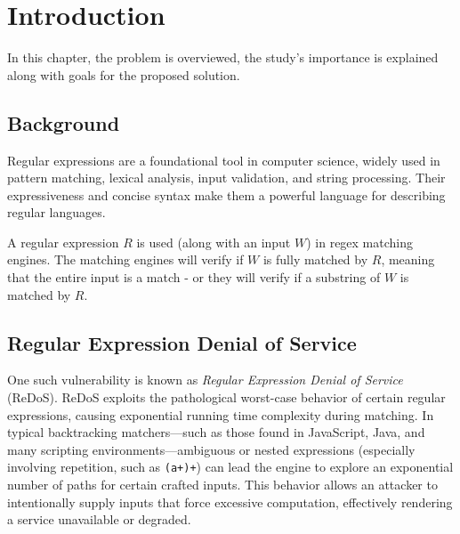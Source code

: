 \chapter{Introduction}\label{chap:intro}


In this chapter, the problem is overviewed, the study's importance is explained along with goals for the proposed solution. 

\section{Background}
Regular expressions are a foundational tool in computer science, widely used in pattern matching, lexical analysis, input validation, and string processing. Their expressiveness and concise syntax make them a powerful language for describing regular languages.


A regular expression $R$ is used (along with an input $W$) in regex matching engines. The matching engines will verify if $W$ is fully matched by $R$, meaning that the entire input is a match - or they will verify if a substring of $W$ is matched by $R$. 


\section{Regular Expression Denial of Service}
One such vulnerability is known as \emph{Regular Expression Denial of Service} (ReDoS). ReDoS exploits the pathological worst-case behavior of certain regular expressions, causing exponential running time complexity during matching. In typical backtracking matchers---such as those found in JavaScript, Java, and many scripting environments---ambiguous or nested expressions (especially involving repetition, such as \texttt{(a+)+}) can lead the engine to explore an exponential number of paths for certain crafted inputs. This behavior allows an attacker to intentionally supply inputs that force excessive computation, effectively rendering a service unavailable or degraded.

